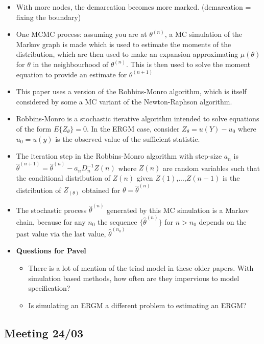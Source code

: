 \begin{itemize}
    \item With more nodes, the demarcation becomes more marked. (demarcation = fixing the boundary)
    \item One MCMC process: assuming you are at $\theta^(n)$, a MC simulation of the Markov graph is made which is used to estimate the moments of the distribution, which are then used to make an expansion approximating $\mu(\theta)$ for $\theta$ in the neighbourhood of $\theta^(n)$. This is then used to solve the moment equation to provide an estimate for $\theta^(n+1)$
    \item This paper uses a version of the Robbins-Monro algorithm, which is itself considered by some a MC variant of the Newton-Raphson algorithm.
    \item Robbins-Monro is a stochastic iterative algorithm intended to solve equations of the form $E\{Z_\theta\} = 0$. In the ERGM case, consider $Z_{\theta} = u(Y) - u_0$ where $u_0 = u(y)$ is the observed value of the sufficient statistic.
    \item The iteration step in the Robbins-Monro algorithm with step-size $a_n$ is $\hat{\theta}^{(n+1)} = \hat{\theta}^{(n)} - a_nD_n^{-1}Z(n)$ where $Z(n)$ are random variables such that the conditional distribution of $Z(n)$ given $Z(1)$,...,$Z(n-1)$ is the distribution of $Z_(\theta)$ obtained for $\theta = \hat{\theta}^(n)$
    \item The stochastic process $\hat{\theta}^(n)$ generated by this MC simulation is a Markov chain, because for any $n_0$ the sequence $\{\hat{\theta}^(n)\}$ for $n > n_0$ depends on the past value via the last value, $\hat{\theta}^(n_0)$
    \item \textbf{Questions for Pavel}
    \begin{itemize}
        \item There is a lot of mention of the triad model in these older papers. With simulation based methods, how often are they impervious to model specification?
        \item Is simulating an ERGM a different problem to estimating an ERGM?
    \end{itemize}
\end{itemize}

\subsection{Meeting 24/03}

